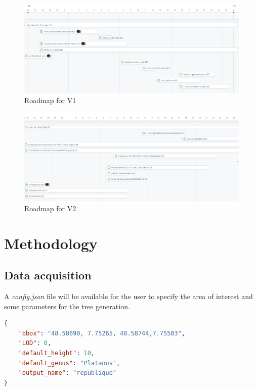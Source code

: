 \documentclass[12pt]{article}
\begin{document}
\begin{figure}[H]
    \centering
    \includegraphics[width=1\textwidth]{images/roadmap_v1.png}
    \caption{Roadmap for V1}
\end{figure}

\begin{figure}[H]
    \centering
    \includegraphics[width=1\textwidth]{images/roadmap_v2.png}
    \caption{Roadmap for V2}
\end{figure}

\newpage

\section{Methodology}

\subsection{Data acquisition}
A \textit{config.json} file will be available for the user to specify the area of
interest and some parameters for the tree generation. \\

\begin{lstlisting}[language=json]
{
    "bbox": "48.58690, 7.75265, 48.58744,7.75503",
    "LOD": 0,
    "default_height": 10,
    "default_genus": "Platanus",
    "output_name": "republique"
}
\end{lstlisting}
\end{document}
